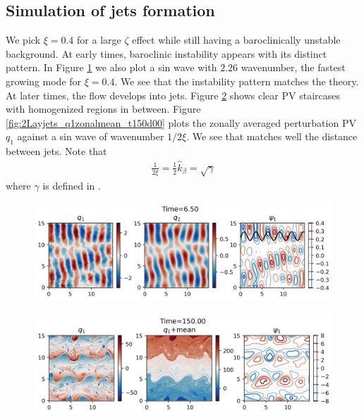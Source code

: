 \subsection{Simulation of jets formation}
We pick $\xi = 0.4$ for a large $\zeta$ effect while still having a baroclinically unstable background. At early times, baroclinic instability appears with its distinct pattern. In Figure \ref{fig:2Layjets_q1_t6d50} we also plot a sin wave with $2.26$ wavenumber, the fastest growing mode for $\xi = 0.4$. We see that the instability pattern matches the theory. At later times, the flow develops into jets. Figure \ref{fig:2Layjets_q1_t150d00} shows clear PV staircases with homogenized regions in between. Figure \ref{fig:2Layjets_q1zonalmean_t150d00} plots the zonally averaged perturbation PV $q_1$ against a sin wave of wavenumber $1/2\xi$. We see that matches well the distance between jets. Note that
\begin{align}
    \frac{1}{2\xi} = \frac{1}{2}\hat{k}_\beta = \sqrt{\gamma}
\end{align}
where $\gamma$ is defined in \cite[(9.115)]{Vallis_17}. 

\begin{figure}
    \centering
    \includegraphics[width=\textwidth]{2Layjets_q1_t6d50}
    \caption{}
    \label{fig:2Layjets_q1_t6d50}
\end{figure}


\begin{figure}
    \centering
    \includegraphics[width=\textwidth]{2Layjets_q1_t150d00}
    \caption{}
    \label{fig:2Layjets_q1_t150d00}
\end{figure}

